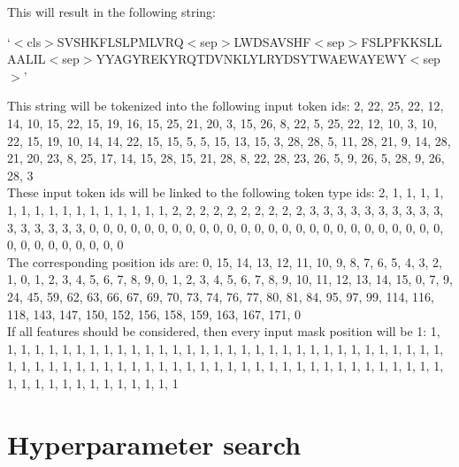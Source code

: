 \documentclass[msc,deptreport,ai]{infthesis} %
\begin{document}
		\noindent This will result in the following string: 
		\begin{center}
		`$<$cls$>$SVSHKFLSLPMLVRQ$<$sep$>$LWDSAVSHF$<$sep$>$FSLPFKKSLL\\AALIL$<$sep$>$YYAGYREKYRQTDVNKLYLRYDSYTWAEWAYEWY$<$sep$>$' 
		\end{center}
		
		\noindent This string will be tokenized into the following input token ids: 2, 22, 25, 22, 12, 14, 10, 15, 22, 15, 19, 16, 15, 25, 21, 20,  3, 15, 26,  8, 22,  5, 25, 22, 12, 10,  3, 10, 22, 15, 19, 10, 14, 14, 22, 15, 15,  5,  5, 15, 13, 15,  3, 28, 28,  5, 11, 28, 21,  9, 14, 28, 21, 20, 23,  8, 25, 17, 14, 15, 28, 15, 21, 28,  8, 22, 28, 23, 26,  5,  9, 26, 5, 28,  9, 26, 28,  3 \\
		
		\noindent These input token ids will be linked to the following token type ids: 2, 1, 1, 1, 1, 1, 1, 1, 1, 1, 1, 1, 1, 1, 1, 1, 1, 2, 2, 2, 2, 2, 2, 2, 2, 2, 2, 3, 3, 3, 3, 3, 3, 3, 3, 3, 3, 3, 3, 3, 3, 3, 3, 0, 0, 0, 0, 0, 0, 0, 0, 0, 0, 0, 0, 0, 0, 0, 0, 0, 0, 0, 0, 0, 0, 0, 0, 0, 0, 0, 0, 0, 0, 0, 0, 0, 0, 0 \\
		
		\noindent The corresponding position ids are: 0,  15,  14,  13,  12,  11,  10,   9,   8,   7,   6,   5,   4,   3,  2,   1,   0,   1,   2,   3,   4,   5,   6,   7,   8,   9,   0,   1,  2,   3,   4,   5,   6,   7,   8,   9,  10,  11,  12,  13,  14,  15,  0,   7,   9,  24,  45,  59,  62,  63,  66,  67,  69,  70,  73,  74,  76,  77,  80,  81,  84,  95,  97,  99, 114, 116, 118, 143, 147, 150,  152, 156, 158, 159, 163, 167, 171,   0 \\

		\noindent If all features should be considered, then every input mask position will be 1: 1, 1, 1, 1, 1, 1, 1, 1, 1, 1, 1, 1, 1, 1, 1, 1, 1, 1, 1, 1, 1, 1, 1, 1, 1, 1, 1, 1, 1, 1, 1, 1, 1, 1, 1, 1, 1, 1, 1, 1, 1, 1, 1, 1, 1, 1, 1, 1, 1, 1, 1, 1, 1, 1, 1, 1, 1, 1, 1, 1, 1, 1, 1, 1, 1, 1, 1, 1, 1, 1, 1, 1, 1, 1, 1, 1, 1, 1 \\


	\section{Hyperparameter search}
	
\end{document}
